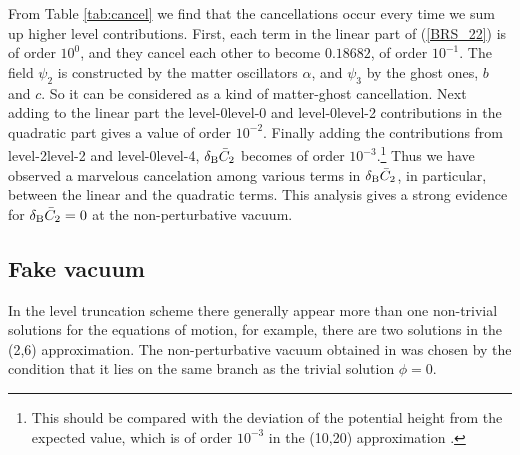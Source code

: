 \documentclass[a4paper,12pt]{article}
\begin{document}
{}From Table \ref{tab:cancel} we find that the cancellations occur every
time we sum up higher level contributions.
First, each term in the linear part of (\ref{BRS_22}) is of order
$10^0$, and they cancel each other to become $0.18682$, of order
$10^{-1}$.
The field $\psi_2$ is constructed by the matter oscillators $\alpha$,
and $\psi_3$ by the ghost ones, $b$ and $c$.
So it can be considered as a kind of matter-ghost cancellation.
Next adding to the linear part the level-0\tm level-0 and
level-0\tm level-2 contributions in the quadratic part gives a value
of order $10^{-2}$. Finally adding the contributions from
level-2\tm level-2 and level-0\tm level-4, $\delta_{\text B}\bar C_2$ becomes of
order $10^{-3}$.\footnote{
This should be compared with the deviation of the potential
height from the expected value,
which is of order $10^{-3}$ in the (10,20) approximation
\cite{Moeller:2000xv}.
}
Thus we have observed a marvelous cancelation among
various terms in $\delta_{\text B}\bar C_2$, in particular, between the linear
and the quadratic terms.
This analysis gives a strong evidence for $\delta_{\text B}\bar C_2=0$ at the
non-perturbative vacuum.

\subsection{Fake vacuum}
\label{sec:fake}

In the level truncation scheme there generally appear more than one
non-trivial solutions for the equations of motion, for example,
there are two solutions in the (2,6) approximation.
The non-perturbative vacuum obtained in \cite{SZ,Moeller:2000xv} was
chosen by the condition that it lies on the same branch as the trivial
solution $\phi=0$.
\end{document}
